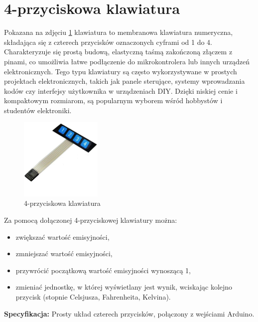 \vspace{12pt}

\section{4-przyciskowa klawiatura}

Pokazana na zdjęciu \ref{fig:klaw}  klawiatura to membranowa klawiatura numeryczna, składająca się z czterech przycisków oznaczonych cyframi od 1 do 4. Charakteryzuje się prostą budową, elastyczną taśmą zakończoną złączem z pinami, co umożliwia łatwe podłączenie do mikrokontrolera lub innych urządzeń elektronicznych. Tego typu klawiatury są często wykorzystywane w prostych projektach elektronicznych, takich jak panele sterujące, systemy wprowadzania kodów czy interfejsy użytkownika w urządzeniach DIY. Dzięki niskiej cenie i kompaktowym rozmiarom, są popularnym wyborem wśród hobbystów i studentów elektroniki.

\begin{figure}[h!]
        \centering
        \includegraphics[width=0.35\textwidth]{images/keyboard4pin.jpg}
        \caption{4-przyciskowa klawiatura}
        \label{fig:klaw}
    \end{figure}

Za pomocą dołączonej 4-przyciskowej klawiatury można:
\begin{itemize}
    \item zwiększać wartość emisyjności,
    \item zmniejszać wartość emisyjności,
    \item przywrócić początkową wartość emisyjności wynoszącą 1,
    \item zmieniać jednostkę, w której wyświetlany jest wynik, wciskając kolejno przycisk (stopnie Celsjusza, Fahrenheita, Kelvina).
\end{itemize}

\textbf{Specyfikacja:} Prosty układ czterech przycisków, połączony z wejściami Arduino.

\vspace{12pt}


